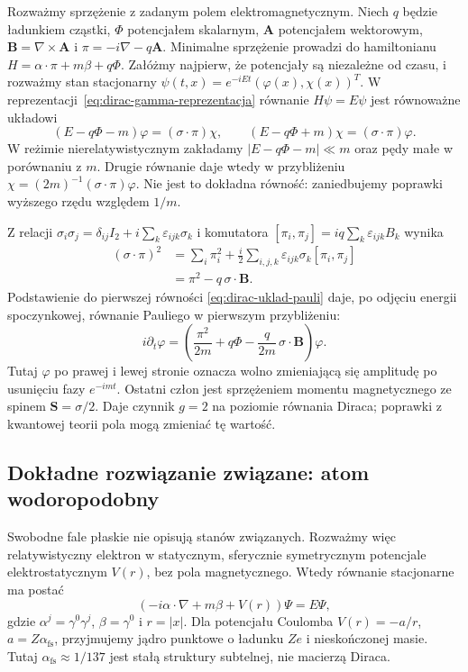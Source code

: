 Rozważmy sprzężenie z zadanym polem elektromagnetycznym.
Niech $q$ będzie ładunkiem cząstki, $\Phi$ potencjałem
skalarnym, $\mathbf A$ potencjałem wektorowym,
$\mathbf B=\nabla\times\mathbf A$ i
$\pi=-i\nabla-q\mathbf A$. Minimalne sprzężenie prowadzi
do hamiltonianu
$H=\alpha\cdot\pi+m\beta+q\Phi$.
Załóżmy najpierw, że potencjały są niezależne od czasu,
i rozważmy stan stacjonarny
$\psi(t,x)=e^{-iEt}(\varphi(x),\chi(x))^T$.
W reprezentacji~\eqref{eq:dirac-gamma-reprezentacja}
równanie $H\psi=E\psi$ jest równoważne układowi
\begin{equation}\label{eq:dirac-uklad-pauli}
 (E-q\Phi-m)\varphi=(\sigma\cdot\pi)\chi,\qquad
 (E-q\Phi+m)\chi=(\sigma\cdot\pi)\varphi.
\end{equation}
W reżimie nierelatywistycznym zakładamy
$|E-q\Phi-m|\ll m$ oraz pędy małe w porównaniu z $m$.
Drugie równanie daje wtedy w przybliżeniu
$\chi=(2m)^{-1}(\sigma\cdot\pi)\varphi$.
Nie jest to dokładna równość: zaniedbujemy poprawki
wyższego rzędu względem $1/m$.

Z relacji $\sigma_i\sigma_j=\delta_{ij}I_2+
 i\sum_k\varepsilon_{ijk}\sigma_k$ i komutatora
$[\pi_i,\pi_j]=iq\sum_k\varepsilon_{ijk}B_k$ wynika
\begin{align*}
 (\sigma\cdot\pi)^2
 &=\sum_i\pi_i^2+
  \frac{i}{2}\sum_{i,j,k}\varepsilon_{ijk}
                    \sigma_k[\pi_i,\pi_j]\\
 &=\pi^2-q\,\sigma\cdot\mathbf B.
\end{align*}
Podstawienie do pierwszej równości
\eqref{eq:dirac-uklad-pauli} daje, po odjęciu energii
spoczynkowej, równanie Pauliego w pierwszym przybliżeniu:
\begin{equation}\label{eq:dirac-pauli}
 i\partial_t\varphi
 =\left(\frac{\pi^2}{2m}+q\Phi
 -\frac{q}{2m}\,\sigma\cdot\mathbf B\right)\varphi.
\end{equation}
Tutaj $\varphi$ po prawej i lewej stronie oznacza wolno
zmieniającą się amplitudę po usunięciu fazy $e^{-imt}$.
Ostatni człon jest sprzężeniem momentu magnetycznego
ze spinem $\mathbf S=\sigma/2$. Daje czynnik $g=2$
na poziomie równania Diraca; poprawki z kwantowej teorii
pola mogą zmieniać tę wartość.

\subsection{Dokładne rozwiązanie związane: atom wodoropodobny}
\label{subsec:dirac-coulomb}

Swobodne fale płaskie nie opisują stanów związanych.
Rozważmy więc relatywistyczny elektron w statycznym,
sferycznie symetrycznym potencjale elektrostatycznym
$V(r)$, bez pola magnetycznego. Wtedy równanie
stacjonarne ma postać
\begin{equation}\label{eq:dirac-centralny}
 \left(-i\alpha\cdot\nabla+m\beta+V(r)\right)\Psi
 =E\Psi,
\end{equation}
gdzie $\alpha^j=\gamma^0\gamma^j$,
$\beta=\gamma^0$ i $r=|x|$.
Dla potencjału Coulomba $V(r)=-a/r$,
$a=Z\alpha_{\mathrm{fs}}$, przyjmujemy jądro
punktowe o ładunku $Ze$ i nieskończonej masie.
Tutaj $\alpha_{\mathrm{fs}}\approx1/137$ jest
stałą struktury subtelnej, nie macierzą Diraca.

